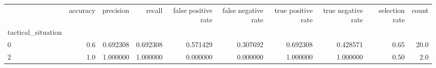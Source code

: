 \begin{tabular}{lrrrrrrrrr}
\toprule
{} &  accuracy &  precision &    recall &  false positive rate &  false negative rate &  true positive rate &  true negative rate &  selection rate &  count \\
tactical\_situation &           &            &           &                      &                      &                     &                     &                 &        \\
\midrule
0                  &       0.6 &   0.692308 &  0.692308 &             0.571429 &             0.307692 &            0.692308 &            0.428571 &            0.65 &   20.0 \\
2                  &       1.0 &   1.000000 &  1.000000 &             0.000000 &             0.000000 &            1.000000 &            1.000000 &            0.50 &    2.0 \\
\bottomrule
\end{tabular}
